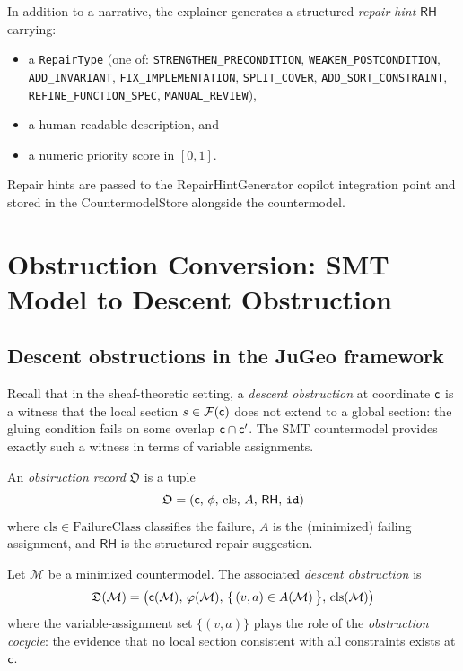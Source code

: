\documentclass[11pt]{article}
\newcommand{\CMod}{\mathcal{M}}            %
\newcommand{\DO}{\mathfrak{D}}             %
\newcommand{\RepairHint}{\mathsf{RH}}      %
\begin{document}
In addition to a narrative, the explainer generates a structured
\emph{repair hint} $\RepairHint$ carrying:
\begin{itemize}[leftmargin=1.5em]
  \item a \texttt{RepairType} (one of: \texttt{STRENGTHEN\_PRECONDITION},
        \texttt{WEAKEN\_POSTCONDITION}, \texttt{ADD\_INVARIANT},
        \texttt{FIX\_IMPLEMENTATION}, \texttt{SPLIT\_COVER},
        \texttt{ADD\_SORT\_CONSTRAINT}, \texttt{REFINE\_FUNCTION\_SPEC},
        \texttt{MANUAL\_REVIEW}),
  \item a human-readable description, and
  \item a numeric priority score in $[0,1]$.
\end{itemize}
Repair hints are passed to the \textsf{RepairHintGenerator} copilot
integration point and stored in the \textsf{CountermodelStore} alongside
the countermodel.


\section{Obstruction Conversion: SMT Model to Descent Obstruction}
\label{sec:obstruction}

\subsection{Descent obstructions in the JuGeo framework}

Recall that in the \JuGeo{} sheaf-theoretic setting, a
\emph{descent obstruction} at coordinate $\mathsf{c}$ is a witness that
the local section $s \in \mathcal{F}(\mathsf{c})$ does not extend to a
global section: the gluing condition fails on some overlap
$\mathsf{c} \cap \mathsf{c}'$.  The SMT countermodel provides exactly such a
witness in terms of variable assignments.

\begin{definition}\label{def:obstruction-record}
An \emph{obstruction record} $\mathfrak{O}$ is a tuple
\[
  \mathfrak{O} = (\coord,\, \phi,\, \mathrm{cls},\, A,\, \RepairHint,\,
                 \mathtt{id})
\]
where $\mathrm{cls} \in \mathrm{FailureClass}$ classifies the failure,
$A$ is the (minimized) failing assignment, and $\RepairHint$ is the
structured repair suggestion.
\end{definition}

\begin{definition}\label{def:do-from-cm}
Let $\CMod$ be a minimized countermodel.  The associated
\emph{descent obstruction} is
\[
  \DO(\CMod) = \bigl(\coord(\CMod),\, \prop(\CMod),\,
               \{\,(v,a) \in A(\CMod) \,\bigr\},\, \mathrm{cls}(\CMod)\bigr)
\]
where the variable-assignment set $\{(v,a)\}$ plays the role of the
\emph{obstruction cocycle}: the evidence that no local section
consistent with all constraints exists at $\mathsf{c}$.
\end{definition}
\end{document}
